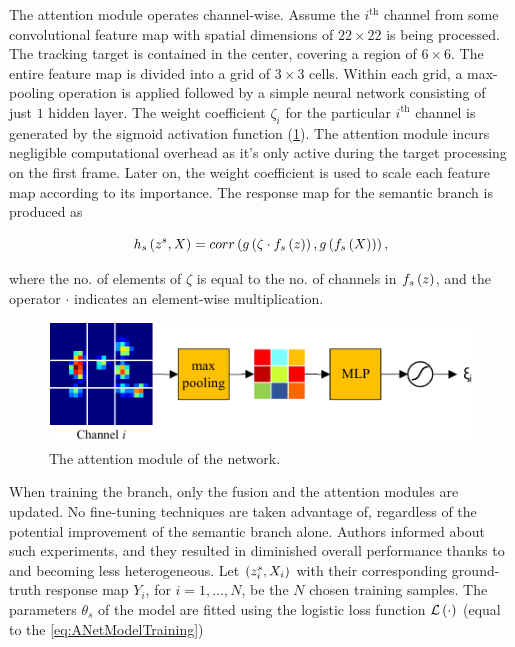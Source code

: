 The attention module operates channel-wise. Assume the $i^{\text{th}}$ channel from some convolutional feature map with spatial dimensions of $22 \times 22$ is being processed. The tracking target is contained in the center, covering a region of $6 \times 6$. The entire feature map is divided into a grid of $3 \times 3$ cells. Within each grid, a max-pooling operation is applied followed by a simple neural network consisting of just $1$ hidden layer. The weight coefficient $\zeta_i$ for the particular $i^{\text{th}}$ channel is generated by the sigmoid activation function (\cref{fig:TwofoldSiameseNetAttentionModule}). The attention module incurs negligible computational overhead as it's only active during the target processing on the first frame. Later on, the weight coefficient is used to scale each feature map according to its importance. The response map for the semantic branch is produced as

\begin{equation}
    {h_s} \left( z^s, X \right) =
    {corr} \left( 
        {g} \left( \zeta \cdot {f_s} \left( z \right) \right),
        {g} \left( {f_s} \left( X \right) \right)
     \right),
\end{equation}

\noindent where the no. of elements of $\zeta$ is equal to the no. of channels in ${f_s} \left( z \right)$, and the operator $\cdot$ indicates an element-wise multiplication.

\begin{figure}[t]
    \centerline{\includegraphics[width=0.6\linewidth]{figures/theoretical_foundations/twofold_siamese_net_attention_module.pdf}}
    \caption[ attention module]{The attention module of the  network. }
    \label{fig:TwofoldSiameseNetAttentionModule}
\end{figure}

When training the  branch, only the fusion and the attention modules are updated. No fine-tuning techniques are taken advantage of, regardless of the potential improvement of the semantic branch alone. Authors informed about such experiments, and they resulted in diminished overall performance thanks to  and  becoming less heterogeneous. Let $\left( {{z}_{i}^{s}, X_i} \right)$ with their corresponding ground-truth response map $Y_i$, for $i = 1, \dots, N$, be the $N$ chosen training samples. The parameters $\theta_s$ of the  model are fitted using the logistic loss function ${\mathcal{L}} \left( \cdot \right)$ (equal to the \cref{eq:ANetModelTraining})

